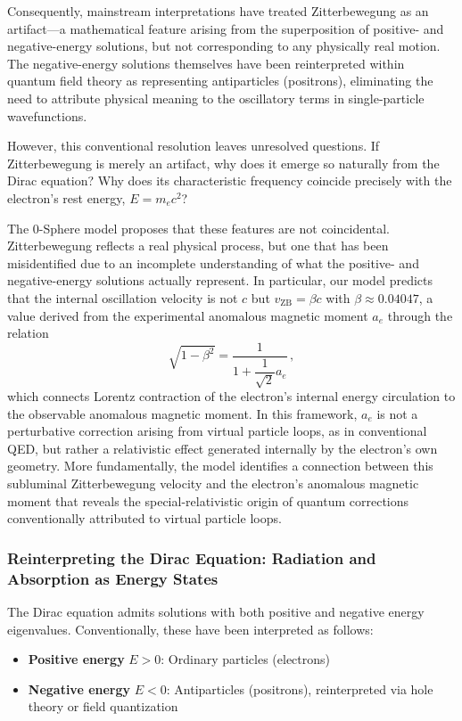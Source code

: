 \documentclass[12pt,letterpaper]{article}
\begin{document}
Consequently, mainstream interpretations have treated Zitterbewegung as an artifact—a mathematical feature arising from the superposition of positive- and negative-energy solutions, but not corresponding to any physically real motion. The negative-energy solutions themselves have been reinterpreted within quantum field theory as representing antiparticles (positrons), eliminating the need to attribute physical meaning to the oscillatory terms in single-particle wavefunctions.

However, this conventional resolution leaves unresolved questions. If Zitterbewegung is merely an artifact, why does it emerge so naturally from the Dirac equation? Why does its characteristic frequency coincide precisely with the electron's rest energy, $E = m_e c^2$?

The 0-Sphere model proposes that these features are not coincidental. Zitterbewegung reflects a real physical process, but one that has been misidentified due to an incomplete understanding of what the positive- and negative-energy solutions actually represent. In particular, our model predicts that the internal oscillation velocity is not $c$ but $v_{\mathrm{ZB}} = \beta c$ with $\beta \approx 0.04047$, a value derived from the experimental anomalous magnetic moment $a_e$ through the relation
\[
  \sqrt{1 - \beta^2} = \frac{1}{1 + \dfrac{1}{\sqrt{2}}a_e}\,,
\]
which connects Lorentz contraction of the electron's internal energy circulation to the observable anomalous magnetic moment. In this framework, $a_e$ is not a perturbative correction arising from virtual particle loops, as in conventional QED, but rather a relativistic effect generated internally by the electron's own geometry. More fundamentally, the model identifies a connection between this subluminal Zitterbewegung velocity and the electron's anomalous magnetic moment that reveals the special-relativistic origin of quantum corrections conventionally attributed to virtual particle loops.

\subsubsection{Reinterpreting the Dirac Equation: Radiation and Absorption as Energy States}
\label{subsubsec:reinterpreting_dirac}

The Dirac equation admits solutions with both positive and negative energy eigenvalues. Conventionally, these have been interpreted as follows:
\begin{itemize}
\item \textbf{Positive energy} $E > 0$: Ordinary particles (electrons)
\item \textbf{Negative energy} $E < 0$: Antiparticles (positrons), reinterpreted via hole theory or field quantization
\end{itemize}
\end{document}
